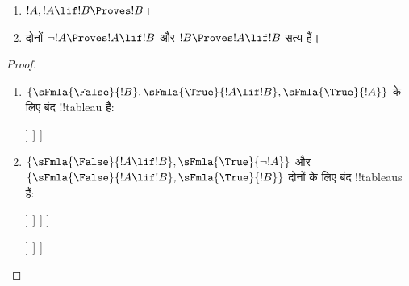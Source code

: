 \documentclass[../../../include/open-logic-section]{subfiles}
\begin{document}
\begin{prop}
  \begin{enumerate}
  \item {}  $!A, !A \lif !B \Proves !B$।
  \item {}
    दोनों $\lnot !A \Proves !A \lif !B$ और $!B \Proves !A \lif !B$ सत्य हैं।
  \end{enumerate}
\end{prop}

\begin{proof}
  \begin{enumerate}
    \item $\{\sFmla{\False}{!B}, \sFmla{\True}{!A \lif !B},
      \sFmla{\True}{!A}\}$ के लिए बंद !!{tableau} है:
      \begin{oltableau}
        [\sFmla{\False}{\formula{B}}, just=\TAss
          [\sFmla{\True}{\formula{A} \lif \formula{B}}, just=\TAss
            [\sFmla{\True}{\formula{A}}, just=\TAss
              [\sFmla{\False}{\formula{A}}, just = {\TRule{\True}{\lif}[2]}, close]
              [\sFmla{\True}{\formula{B}}, just = {\TRule{\True}{\lif}[2]}, close]
            ]
          ]
        ]
      \end{oltableau}
    \item $\{\sFmla{\False}{!A \lif !B},
      \sFmla{\True}{\lnot !A}\}$ और $\{\sFmla{\False}{!A \lif !B},
      \sFmla{\True}{!B}\}$ दोनों के लिए बंद !!{tableau}s हैं:
      \begin{oltableau}
        [\sFmla{\False}{\formula{A} \lif \formula{B}}, just = \TAss
          [\sFmla{\True}{\lnot \formula{A}}, just = \TAss
            [\sFmla{\True}{\formula{A}}, just = {\TRule{\False}{\lif}[1]}
              [\sFmla{\False}{\formula{B}}, just = {\TRule{\False}{\lif}[1]}
                [\sFmla{\False}{\formula{A}}, just = {\TRule{\True}{\lnot}[2]}, close]
              ]
            ]
          ]
        ]
      \end{oltableau}
      \begin{oltableau}
        [\sFmla{\False}{\formula{A} \lif \formula{B}}, just = \TAss
          [\sFmla{\True}{\formula{B}}, just = \TAss
            [\sFmla{\True}{\formula{A}}, just = {\TRule{\False}{\lif}[1]}
              [\sFmla{\False}{\formula{B}}, just = {\TRule{\False}{\lif}[1]},close
              ]
            ]
          ]
        ]
      \end{oltableau}
  \end{enumerate}
\end{proof}
\end{document}

